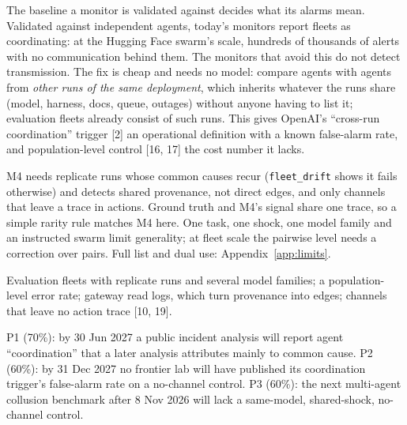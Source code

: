 \label{sec:discussion}
 The baseline a monitor is validated against decides what its alarms mean. Validated against independent agents, today's monitors report fleets as coordinating: at the Hugging Face swarm's scale, hundreds of thousands of alerts with no communication behind them. The monitors that avoid this do not detect transmission. The fix is cheap and needs no model: compare agents with agents from \emph{other runs of the same deployment}, which inherits whatever the runs share (model, harness, docs, queue, outages) without anyone having to list it; evaluation fleets already consist of such runs. This gives OpenAI's ``cross-run coordination'' trigger [2] an operational definition with a known false-alarm rate, and population-level control [16, 17] the cost number it lacks.

 M4 needs replicate runs whose common causes recur (\texttt{fleet\_drift} shows it fails otherwise) and detects shared provenance, not direct edges, and only channels that leave a trace in actions. Ground truth and M4's signal share one trace, so a simple rarity rule matches M4 here. One task, one shock, one model family and an instructed swarm limit generality; at fleet scale the pairwise level needs a correction over pairs. Full list and dual use: Appendix~\ref{app:limits}.

 Evaluation fleets with replicate runs and several model families; a population-level error rate; gateway read logs, which turn provenance into edges; channels that leave no action trace [10, 19].

 P1 (70\%): by 30 Jun 2027 a public incident analysis will report agent ``coordination'' that a later analysis attributes mainly to common cause. P2 (60\%): by 31 Dec 2027 no frontier lab will have published its coordination trigger's false-alarm rate on a no-channel control. P3 (60\%): the next multi-agent collusion benchmark after 8 Nov 2026 will lack a same-model, shared-shock, no-channel control.
